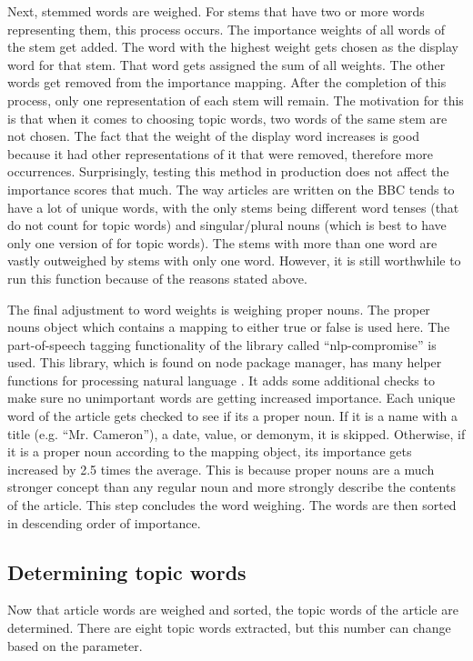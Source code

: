 \documentclass[11pt,titlepage]{report}
\begin{document}
Next, stemmed words are weighed. For stems that have two or more words representing them, this process occurs. The importance weights of all words of the stem get added. The word with the highest weight gets chosen as the display word for that stem. That word gets assigned the sum of all weights. The other words get removed from the importance mapping. After the completion of this process, only one representation of each stem will remain. The motivation for this is that when it comes to choosing topic words, two words of the same stem are not chosen. The fact that the weight of the display word increases is good because it had other representations of it that were removed, therefore more occurrences. Surprisingly, testing this method in production does not affect the importance scores that much. The way articles are written on the BBC tends to have a lot of unique words, with the only stems being different word tenses (that do not count for topic words) and singular/plural nouns (which is best to have only one version of for topic words). The stems with more than one word are vastly outweighed by stems with only one word. However, it is still worthwhile to run this function because of the reasons stated above.

The final adjustment to word weights is weighing proper nouns. The proper nouns object which contains a mapping to either true or false is used here. The part-of-speech tagging functionality of the library called ``nlp-compromise'' is used. This library, which is found on node package manager, has many helper functions for processing natural language \cite{nlpcompromise}. It adds some additional checks to make sure no unimportant words are getting increased importance. Each unique word of the article gets checked to see if its a proper noun. If it is a name with a title (e.g. ``Mr. Cameron''), a date, value, or demonym, it is skipped. Otherwise, if it is a proper noun according to the mapping object, its importance gets increased by 2.5 times the average. This is because proper nouns are a much stronger concept than any regular noun and more strongly describe the contents of the article. This step concludes the word weighing. The words are then sorted in descending order of importance.

\subsection{Determining topic words}
Now that article words are weighed and sorted, the topic words of the article are determined. There are eight topic words extracted, but this number can change based on the parameter. 
\end{document}
